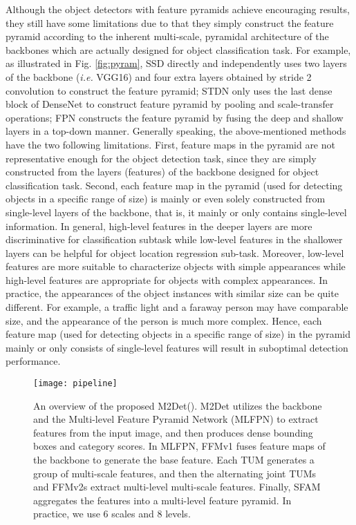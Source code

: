 \documentclass[letterpaper]{article} \usepackage{aaai18}  \usepackage{times}  \usepackage{helvet}  \usepackage{courier}  \usepackage{url}  \usepackage{graphicx}
\begin{document}
Although the object detectors with feature pyramids \cite{LiuAESRFB16,LinDGHHB17,LinGGHD17,HeGDG17} achieve encouraging results, they still have some limitations due to that they simply construct the feature pyramid according to the inherent multi-scale, pyramidal architecture of the backbones which are actually designed for object classification task. For example, as illustrated in Fig. \ref{fig:pyram}, SSD \cite{LiuAESRFB16} directly and independently uses two layers of the backbone (\textit{i.e.} VGG16) and four extra layers obtained by stride 2 convolution to construct the feature pyramid; STDN \cite{zhou2018scale} only uses the last dense block of DenseNet \cite{huang2017densely} to construct feature pyramid by pooling and scale-transfer operations; FPN \cite{LinDGHHB17} constructs the feature pyramid by fusing the deep and shallow layers in a top-down manner. Generally speaking, the above-mentioned methods have the two following limitations. First, feature maps in the pyramid are not representative enough for the object detection task, since they are simply constructed from the layers (features) of the backbone designed for object classification task. Second, each feature map in the pyramid (used for detecting objects in a specific range of size) is mainly or even solely constructed from single-level layers of the backbone, that is, it mainly or only contains single-level information. In general, high-level features in the deeper layers are more discriminative for classification subtask while low-level features in the shallower layers can be helpful for object location regression sub-task. Moreover, low-level features are more suitable to characterize objects with simple appearances while high-level features are appropriate for objects with complex appearances. In practice, the appearances of the object instances with similar size can be quite different. For example, a traffic light and a faraway person may have comparable size, and the appearance of the person is much more complex. Hence, each feature map (used for detecting objects in a specific range of size) in the pyramid mainly or only consists of single-level features will result in suboptimal detection performance.
\begin{figure*}[t]
\centering
\texttt{[image: pipeline]}
\caption{An overview of the proposed M2Det(). M2Det utilizes the backbone and the Multi-level Feature Pyramid Network (MLFPN) to extract features from the input image, and then produces dense bounding boxes and category scores. In MLFPN, FFMv1 fuses feature maps of the backbone to generate the base feature. Each TUM generates a group of multi-scale features, and then the alternating joint TUMs and FFMv2s extract multi-level multi-scale features. Finally, SFAM aggregates the features into a multi-level feature pyramid. In practice, we use 6 scales and 8 levels.}
\label{fig:pipeline}
\end{figure*}
\end{document}
